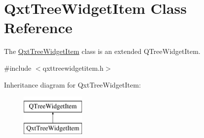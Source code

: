 \hypertarget{class_qxt_tree_widget_item}{\section{Qxt\-Tree\-Widget\-Item Class Reference}
\label{class_qxt_tree_widget_item}
}


The \hyperlink{class_qxt_tree_widget_item}{Qxt\-Tree\-Widget\-Item} class is an extended Q\-Tree\-Widget\-Item.  




{\ttfamily \#include $<$qxttreewidgetitem.\-h$>$}

Inheritance diagram for Qxt\-Tree\-Widget\-Item\-:\begin{figure}[H]
\begin{center}
\leavevmode
\includegraphics[height=2.000000cm]{class_qxt_tree_widget_item}
\end{center}
\end{figure}
